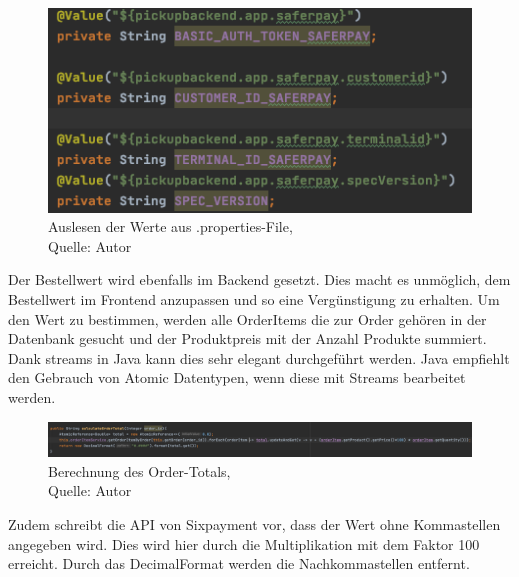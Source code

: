  \begin{figure}[H]
	\centering
	\includegraphics[scale=0.4]{images/valuesFromProperties.PNG}
	\caption[Auslesen der Werte aus .properties-File]{Auslesen der Werte aus .properties-File,\\ Quelle: Autor}
	\label{img: valuesFromProperties}
\end{figure} 
Der Bestellwert wird ebenfalls im Backend gesetzt. Dies macht es unmöglich, dem Bestellwert im Frontend anzupassen und so eine Vergünstigung zu erhalten. Um den Wert zu bestimmen, werden alle OrderItems die zur Order gehören in der Datenbank gesucht und der Produktpreis mit der Anzahl Produkte summiert. Dank streams in Java kann dies sehr elegant durchgeführt werden. Java empfiehlt den Gebrauch von Atomic Datentypen, wenn diese mit Streams bearbeitet werden. 
 \begin{figure}[H]
	\centering
	\includegraphics[width=1\textwidth]{images/calculateTotal.PNG}
	\caption[Berechnung des Order-Totals]{Berechnung des Order-Totals,\\ Quelle: Autor}
	\label{img: orderTotal}
\end{figure} 
Zudem schreibt die API von Sixpayment vor, dass der Wert ohne Kommastellen angegeben wird. Dies wird hier durch die Multiplikation mit dem Faktor 100 erreicht.
Durch das DecimalFormat werden die Nachkommastellen entfernt. 

